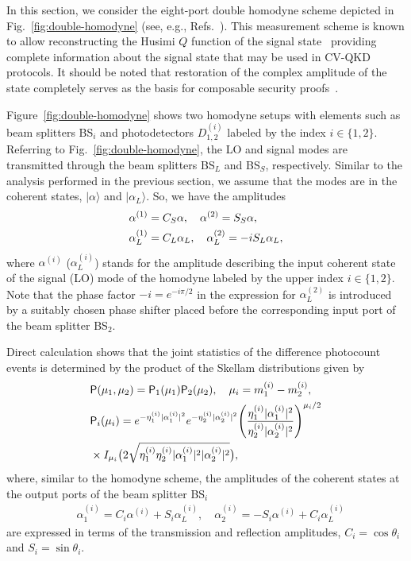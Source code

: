\documentclass[%
reprint,
superscriptaddress,
 amsmath,amssymb,amsfonts,
 aps,
 pra,
 longbibliography
]{revtex4-2}
\newcommand{\ket}[1]{\ensuremath{|{#1}\rangle}}
\newcommand{\prob}{\mathsf{P}}
\begin{document}
In this section,
we consider the eight-port double homodyne scheme
depicted in Fig.~\ref{fig:double-homodyne}
(see, e.g., Refs.~\cite{Vogel:bk:2006,lahti2010realistic}).
This measurement scheme is known to allow reconstructing the
Husimi $Q$ function of the signal state~\cite{Richter:98} providing complete information about the signal
state that may be used in CV-QKD protocols. It should be noted that restoration of the
complex amplitude of the state completely serves as the basis for composable security
proofs~\cite{PhysRevLett.93.170504,PhysRevLett.118.200501}.

Figure~\ref{fig:double-homodyne} shows two homodyne setups
with elements such as beam splitters BS$_i$
and photodetectors $D_{1,2}^{(i)}$ labeled by the index $i\in\{1,2\}$.
Referring to Fig.~\ref{fig:double-homodyne},
the LO and signal modes are transmitted through
the beam splitters BS$_L$ and BS$_S$, respectively.
Similar to the analysis performed in the previous section,
we assume that the modes are in the coherent states,
$\ket{\alpha}$ and $\ket{\alpha_L}$. So, we
have the amplitudes 
\begin{align}
  &
    \label{eq:amplitudes-SL-i}
    \alpha^{(1)}=C_S\alpha,\quad \alpha^{(2)}=S_S\alpha,
    \notag
  \\
  &
    \alpha_L^{(1)}=C_L\alpha_L,\quad \alpha_L^{(2)}=-iS_L\alpha_L,
\end{align}
where $\alpha^{(i)}$ ($\alpha_{L}^{(i)}$) stands for the amplitude
describing the input coherent state of the signal (LO) mode
of the homodyne labeled by the upper index $i\in \{1,2\}$. 
Note that the phase factor $-i=e^{-i\pi/2}$ in the expression for
$\alpha^{(2)}_L$ is introduced by
a suitably chosen phase shifter placed before
the corresponding input port
of the beam splitter BS$_2$.

Direct calculation shows that
the joint statistics of the difference photocount events
is determined by the product
of the Skellam distributions given by
\begin{align}
  &
    \label{eq:P_mu1m2}
    \prob(\mu_1,\mu_2)=\prob_1(\mu_1)\prob_2(\mu_2),
    \quad \mu_i=m_1^{(i)}-m_2^{(i)},
  \\
  &
  \label{eq:Skel-i}
  \prob_i(\mu_i)=e^{-\eta_1^{(i)}|\alpha_1^{(i)}|^2}e^{-\eta_2^{(i)}|\alpha_2^{(i)}|^2}
    \Biggl(\frac{\eta_1^{(i)}|\alpha_1^{(i)}|^2}{\eta_2^{(i)}|\alpha_2^{(i)}|^2}\Biggr)^{\mu_i/2}
    \notag
  \\
  &
    \times
I_{\mu_i}\bigl(2\sqrt{\eta_1^{(i)}\eta_2^{(i)}|\alpha_1^{(i)}|^2|\alpha_2^{(i)}|^2}\bigr),
\end{align}
where, similar to the homodyne scheme,
the amplitudes of the coherent states at the output ports of the beam splitter
BS$_i$
\begin{align}
  &
    \label{eq:amplitudes-i}
    \alpha_1^{(i)}=C_i\alpha^{(i)}+S_i\alpha_L^{(i)},\quad
    \alpha_2^{(i)}=-S_i\alpha^{(i)}+C_i\alpha_L^{(i)}
\end{align}
are expressed in terms of the transmission and reflection amplitudes,
$C_i=\cos\theta_i$ and $S_i=\sin\theta_i$.
\end{document}
